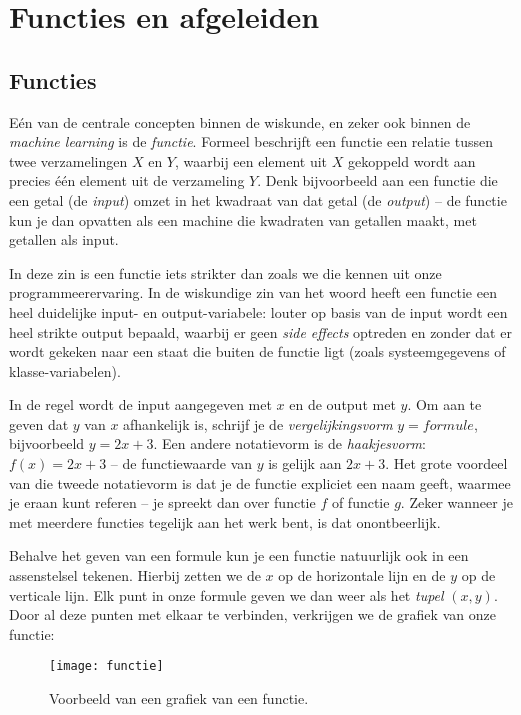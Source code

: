 \section{Functies en afgeleiden}



\subsection{Functies}

Eén van de centrale concepten binnen de wiskunde, en zeker ook binnen de \textit{machine learning} is de \textit{functie}. Formeel beschrijft een functie een relatie tussen twee verzamelingen $X$ en $Y$, waarbij een element uit $X$ gekoppeld wordt aan precies één element uit de verzameling $Y$. Denk bijvoorbeeld aan een functie die een getal (de \textit{input}) omzet in het kwadraat van dat getal (de \textit{output}) – de functie kun je dan opvatten als een machine die kwadraten van getallen maakt, met getallen als input. 

In deze zin is een functie iets strikter dan zoals we die kennen uit onze programmeerervaring. In de wiskundige zin van het woord heeft een functie een heel duidelijke input- en output-variabele: louter op basis van de input wordt een heel strikte output bepaald, waarbij er geen \textit{side effects} optreden en zonder dat er wordt gekeken naar een staat die buiten de functie ligt (zoals systeemgegevens of klasse-variabelen).

In de regel wordt de input aangegeven met $x$ en de output met $y$. Om aan te geven dat $y$ van $x$ afhankelijk is, schrijf je de \textit{vergelijkingsvorm} $y=formule$, bijvoorbeeld $y=2x+3$. Een andere notatievorm is de \textit{haakjesvorm}: $f(x) = 2x+3$ – de functiewaarde van $y$ is gelijk aan $2x+3$. Het grote voordeel van die tweede notatievorm is dat je de functie expliciet een naam geeft, waarmee je eraan kunt referen – je spreekt dan over functie $f$ of functie $g$. Zeker wanneer je met meerdere functies tegelijk aan het werk bent, is dat onontbeerlijk. 

Behalve het geven van een formule kun je een functie natuurlijk ook in een assenstelsel tekenen. Hierbij zetten we de $x$ op de horizontale lijn en de $y$ op de verticale lijn. Elk punt in onze formule geven we dan weer als het \textit{tupel} $(x,y)$. Door al deze punten met elkaar te verbinden, verkrijgen we de grafiek van onze functie:

\begin{figure}[h!]
    \centering
    \texttt{[image: functie]}
    \caption{Voorbeeld van een grafiek van een functie.\label{img:functie}}
\end{figure}

